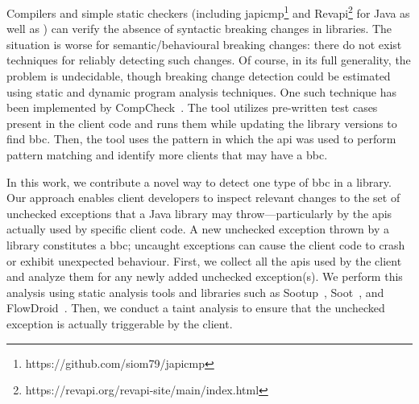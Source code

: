 Compilers and simple static
checkers (including japicmp\footnote{https://github.com/siom79/japicmp} and Revapi\footnote{https://revapi.org/revapi-site/main/index.html} for Java as well as \cite{brito18:_apidif,foo18:_effic_static_check_librar_updat})
can verify the absence of syntactic breaking changes in libraries. The situation is worse for semantic/behavioural breaking changes:
there do not exist techniques for reliably detecting such changes. Of
course, in its full generality, the problem is undecidable, though
breaking change detection could be estimated using static and dynamic program analysis
techniques. One such technique has been implemented by CompCheck~\cite{CompCheck}. The tool utilizes pre-written test cases present in the client code and runs them while updating the library versions to find \gls{bbc}. Then, the tool uses the pattern in which the \gls{api} was used to perform pattern matching and identify more clients that may have a \gls{bbc}.

In this work, we contribute a novel way to detect one type of \gls{bbc} in a library. Our approach enables client developers to inspect relevant changes to the set of unchecked exceptions that a Java library may throw—particularly by the \gls{api}s actually used by specific client code. A new unchecked exception thrown by a library constitutes a \gls{bbc}; uncaught exceptions can cause the client code to crash or exhibit unexpected behaviour. First, we collect all the \gls{api}s used by the client and analyze them for any newly added unchecked exception(s). We perform this analysis using static analysis tools and libraries such as Sootup~\cite{Karakaya24:_sootup}, Soot~\cite{vallee2010soot}, and FlowDroid~\cite{Arzt14:_flowdroid}. Then, we conduct a taint analysis to ensure that the unchecked exception is actually triggerable by the client.


